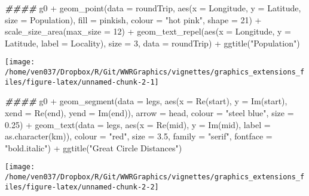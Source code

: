 \documentclass[
]{article}
\newenvironment{Shaded}{\begin{snugshade}}{\end{snugshade}}
\newcommand{\AttributeTok}[1]{\textcolor[rgb]{0.77,0.63,0.00}{#1}}
\newcommand{\DecValTok}[1]{\textcolor[rgb]{0.00,0.00,0.81}{#1}}
\newcommand{\DocumentationTok}[1]{\textcolor[rgb]{0.56,0.35,0.01}{\textbf{\textit{#1}}}}
\newcommand{\FloatTok}[1]{\textcolor[rgb]{0.00,0.00,0.81}{#1}}
\newcommand{\FunctionTok}[1]{\textcolor[rgb]{0.00,0.00,0.00}{#1}}
\newcommand{\NormalTok}[1]{#1}
\newcommand{\SpecialCharTok}[1]{\textcolor[rgb]{0.00,0.00,0.00}{#1}}
\newcommand{\StringTok}[1]{\textcolor[rgb]{0.31,0.60,0.02}{#1}}
\begin{document}
\begin{Shaded}
\begin{Highlighting}[]
\DocumentationTok{\#\#\#\#}
\NormalTok{g0 }\SpecialCharTok{+} \FunctionTok{geom\_point}\NormalTok{(}\AttributeTok{data =}\NormalTok{ roundTrip, }\FunctionTok{aes}\NormalTok{(}\AttributeTok{x =}\NormalTok{ Longitude, }\AttributeTok{y =}\NormalTok{ Latitude, }
                                      \AttributeTok{size =}\NormalTok{ Population),}
                \AttributeTok{fill =}\NormalTok{ pinkish, }\AttributeTok{colour =} \StringTok{"hot pink"}\NormalTok{, }\AttributeTok{shape =} \DecValTok{21}\NormalTok{) }\SpecialCharTok{+} 
  \FunctionTok{scale\_size\_area}\NormalTok{(}\AttributeTok{max\_size =} \DecValTok{12}\NormalTok{) }\SpecialCharTok{+}
  \FunctionTok{geom\_text\_repel}\NormalTok{(}\FunctionTok{aes}\NormalTok{(}\AttributeTok{x =}\NormalTok{ Longitude, }\AttributeTok{y =}\NormalTok{ Latitude, }\AttributeTok{label =}\NormalTok{ Locality),}
                  \AttributeTok{size =} \DecValTok{3}\NormalTok{, }\AttributeTok{data =}\NormalTok{ roundTrip) }\SpecialCharTok{+} \FunctionTok{ggtitle}\NormalTok{(}\StringTok{"Population"}\NormalTok{)}
\end{Highlighting}
\end{Shaded}

\texttt{[image: /home/ven037/Dropbox/R/Git/WWRGraphics/vignettes/graphics\_extensions\_files/figure-latex/unnamed-chunk-2-1]}

\begin{Shaded}
\begin{Highlighting}[]
\DocumentationTok{\#\#\#\#}
\NormalTok{g0 }\SpecialCharTok{+} \FunctionTok{geom\_segment}\NormalTok{(}\AttributeTok{data =}\NormalTok{ legs, }\FunctionTok{aes}\NormalTok{(}\AttributeTok{x =} \FunctionTok{Re}\NormalTok{(start), }\AttributeTok{y =} \FunctionTok{Im}\NormalTok{(start),}
                                   \AttributeTok{xend =} \FunctionTok{Re}\NormalTok{(end), }\AttributeTok{yend =} \FunctionTok{Im}\NormalTok{(end)),}
                  \AttributeTok{arrow =}\NormalTok{ head, }\AttributeTok{colour =} \StringTok{"steel blue"}\NormalTok{, }\AttributeTok{size =} \FloatTok{0.25}\NormalTok{) }\SpecialCharTok{+}
  \FunctionTok{geom\_text}\NormalTok{(}\AttributeTok{data =}\NormalTok{ legs, }\FunctionTok{aes}\NormalTok{(}\AttributeTok{x =} \FunctionTok{Re}\NormalTok{(mid), }\AttributeTok{y =} \FunctionTok{Im}\NormalTok{(mid), }
                             \AttributeTok{label =} \FunctionTok{as.character}\NormalTok{(km)), }\AttributeTok{colour =} \StringTok{"red"}\NormalTok{,}
            \AttributeTok{size =} \FloatTok{3.5}\NormalTok{, }\AttributeTok{family =} \StringTok{"serif"}\NormalTok{, }\AttributeTok{fontface =} \StringTok{"bold.italic"}\NormalTok{) }\SpecialCharTok{+} 
  \FunctionTok{ggtitle}\NormalTok{(}\StringTok{"Great Circle Distances"}\NormalTok{)}
\end{Highlighting}
\end{Shaded}

\texttt{[image: /home/ven037/Dropbox/R/Git/WWRGraphics/vignettes/graphics\_extensions\_files/figure-latex/unnamed-chunk-2-2]}
\end{document}

